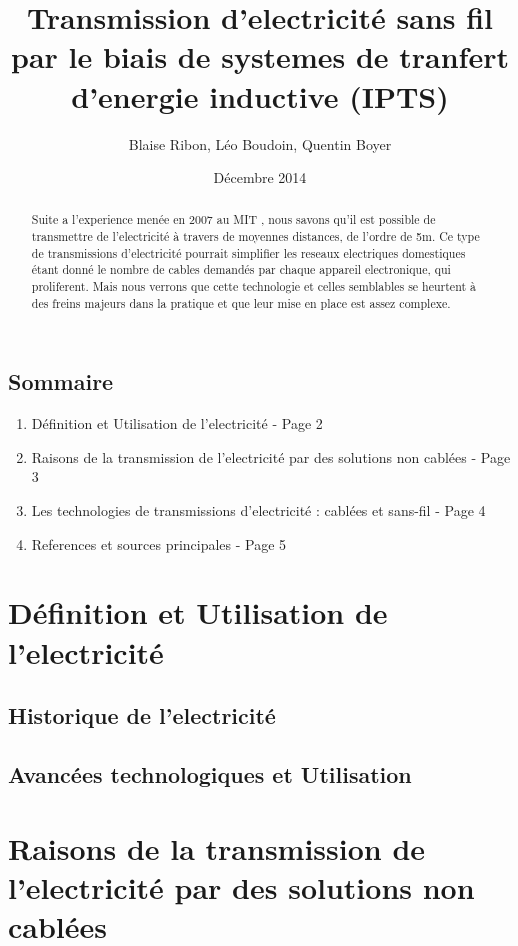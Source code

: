 \documentclass[12pt]{report}
\begin{document}
\title{Transmission d'electricité sans fil par le biais de systemes de tranfert d'energie inductive (IPTS)}
\author{Blaise Ribon, Léo Boudoin, Quentin Boyer}
\date{Décembre 2014}
\maketitle

\begin{abstract}
	Suite a l'experience menée en 2007 au MIT , nous savons qu'il est possible de transmettre de l'electricité à travers de moyennes distances, de l'ordre de 5m. Ce type de transmissions d'electricité pourrait simplifier les reseaux electriques domestiques étant donné le nombre de cables demandés par chaque appareil electronique, qui proliferent. Mais nous verrons que cette technologie et celles semblables se heurtent à des freins majeurs dans la pratique et que leur mise en place est assez complexe.
\end{abstract}

\section{Sommaire}
\begin{enumerate}
 	\item Définition et Utilisation de l'electricité - Page 2
	\item Raisons de la transmission de l'electricité par des solutions non cablées - Page 3
	\item Les technologies de transmissions d'electricité : cablées et sans-fil - Page 4
	\item References et sources principales - Page 5
\end{enumerate}

\chapter{Définition et Utilisation de l'electricité} %
\section{Historique de l'electricité}
\section{Avancées technologiques et Utilisation}

\chapter{Raisons de la transmission de l'electricité par des solutions non cablées} %
\end{document}
